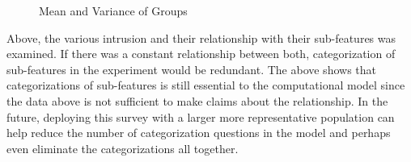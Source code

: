 \begin{figure}[htp]
\hspace{1em}
\newline
\centering
{}
\caption{Mean and Variance of Groups}
\label{fig:st3}
\end{figure}

Above, the various intrusion and their relationship with their sub-features was examined. If there was a constant relationship between both, categorization of sub-features in the experiment would be redundant. The above shows that categorizations of sub-features is still essential to the computational model since the data above is not sufficient to make claims about the relationship. In the future, deploying this survey with a larger more representative population can help reduce the number of categorization questions in the model and perhaps even eliminate the categorizations all together.

